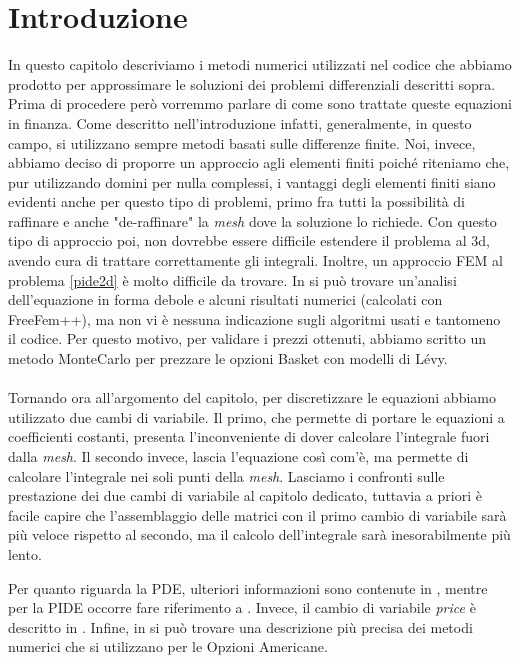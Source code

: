 \documentclass[a4paper,10pt]{report}
\theoremstyle{plain}
\theoremstyle{definition}
\theoremstyle{remark}
\begin{document}
\section{Introduzione}
In questo capitolo descriviamo i metodi numerici utilizzati nel codice che abbiamo prodotto per approssimare le soluzioni dei problemi differenziali descritti sopra. Prima di procedere per\`o vorremmo parlare di come sono trattate queste equazioni in finanza. Come descritto nell'introduzione infatti, generalmente, in questo campo, si utilizzano sempre metodi basati sulle differenze finite. Noi, invece, abbiamo deciso di proporre un approccio agli elementi finiti poich\'e riteniamo che, pur utilizzando domini per nulla complessi, i vantaggi degli elementi finiti siano evidenti anche per questo tipo di problemi, primo fra tutti la possibilit\`a di raffinare e anche "de-raffinare" la \emph{mesh} dove la soluzione lo richiede. Con questo tipo di approccio poi, non dovrebbe essere difficile estendere il problema al 3d, avendo cura di trattare correttamente gli integrali. Inoltre, un approccio FEM al problema \ref{pide2d} è molto difficile da trovare. In \cite{jinghui2009multi} si può trovare un'analisi dell'equazione in forma debole e alcuni risultati numerici (calcolati con \textsf{FreeFem++}), ma non vi è nessuna indicazione sugli algoritmi usati e tantomeno il codice. Per questo motivo, per validare i prezzi ottenuti, abbiamo scritto un metodo MonteCarlo per prezzare le opzioni Basket con modelli di L\'evy.\\\\Tornando ora all'argomento del capitolo, per discretizzare le equazioni abbiamo utilizzato due cambi di variabile. Il primo, che permette di portare le equazioni a coefficienti costanti, presenta l'inconveniente di dover calcolare l'integrale fuori dalla \emph{mesh}. Il secondo invece, lascia l'equazione cos\`i com'\`e, ma permette di calcolare l'integrale nei soli punti della \emph{mesh}. Lasciamo i confronti sulle prestazione dei due cambi di variabile al capitolo dedicato, tuttavia a priori \`e facile capire che l'assemblaggio delle matrici con il primo cambio di variabile sar\`a pi\`u veloce rispetto al secondo, ma il calcolo dell'integrale sar\`a inesorabilmente pi\`u lento.

Per quanto riguarda la PDE, ulteriori informazioni sono contenute in \cite{seydel2002tools}, mentre per la PIDE occorre fare riferimento a \cite{tankov2003financial}. Invece, il cambio di variabile \emph{price} \`e descritto in \cite{achdou2005computational}. Infine, in \cite{feng2011solution} si pu\`o trovare una descrizione pi\`u precisa dei metodi numerici che si utilizzano per le Opzioni Americane.
\end{document}
